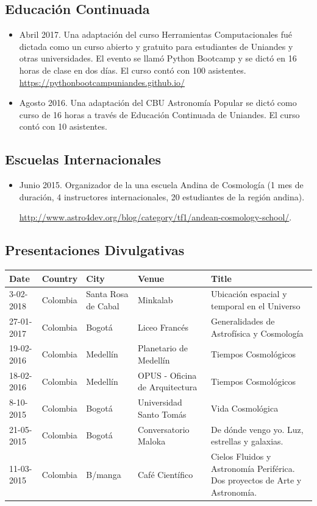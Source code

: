 \documentclass{article}
\begin{document}
\subsection{Educaci\'on Continuada}
\begin{itemize}
\item Abril 2017. Una adaptaci\'on del curso Herramientas Computacionales fu\'e
  dictada como un curso abierto y gratuito para estudiantes de
  Uniandes y otras universidades. El evento se llam\'o Python Bootcamp
  y se dict\'o en 16 horas de clase en dos d\'ias. El curso cont\'o
  con 100 asistentes. \url{https://pythonbootcampuniandes.github.io/}
\item Agosto 2016. Una adaptaci\'on del CBU Astronom\'ia Popular se dict\'o como
  curso de 16 horas a trav\'es de Educaci\'on Continuada de
  Uniandes. El curso cont\'o con 10 asistentes.
\end{itemize}

\subsection{Escuelas Internacionales}
\begin{itemize}
\item {Junio 2015. Organizador de la una escuela Andina de
  Cosmolog\'ia (1 mes de duraci\'on, 4 instructores internacionales,
  20 estudiantes de la regi\'on andina). 

\url{http://www.astro4dev.org/blog/category/tf1/andean-cosmology-school/}. }
\end{itemize}

\subsection{Presentaciones Divulgativas}

\begin{tabular}{p{1.7cm} p{1.2cm} p{2.0cm} p{5.0cm} p{4.5cm}}\hline
Date & Country & City& Venue& Title\\\hline

3-02-2018 & Colombia & Santa Rosa de Cabal & Minkalab & Ubicaci\'on
espacial y temporal en el Universo\\
27-01-2017 & Colombia & Bogot\'a & Liceo Franc\'es & Generalidades de Astrof\'isica y Cosmolog\'ia\\
19-02-2016 & Colombia & Medell\'in & Planetario de Medell\'in & Tiempos Cosmol\'ogicos\\
18-02-2016 & Colombia & Medell\'in & OPUS - Oficina de Arquitectura & Tiempos Cosmol\'ogicos\\
8-10-2015  & Colombia & Bogot\'a & Universidad Santo Tom\'as & Vida Cosmol\'ogica \\
21-05-2015 & Colombia & Bogot\'a & Conversatorio Maloka & De d\'onde vengo yo. Luz, estrellas y galaxias.\\
11-03-2015 & Colombia & B/manga & Caf\'e Cient\'ifico & Cielos Fluidos y Astronom\'ia Perif\'erica. Dos proyectos de Arte y Astronom\'ia.\\\hline
\end{tabular}
\end{document}

